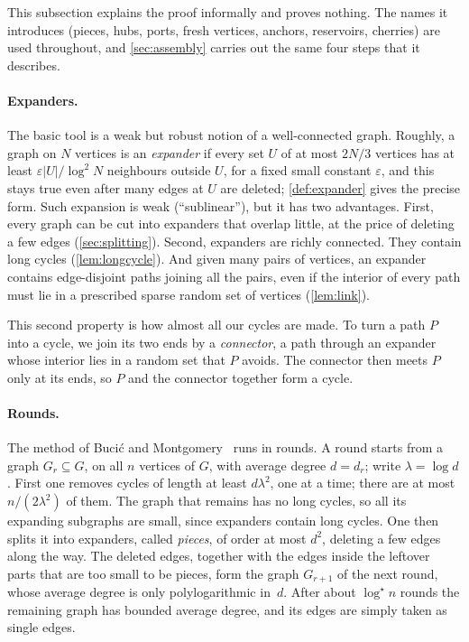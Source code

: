 \documentclass[11pt]{article}
\theoremstyle{definition}
\theoremstyle{remark}
\numberwithin{equation}{section}
\numberwithin{figure}{section}
\numberwithin{table}{section}
\newcommand{\eps}{\varepsilon}
\begin{document}
This subsection explains the proof informally and proves nothing. The names it
introduces (pieces, hubs, ports, fresh vertices, anchors, reservoirs, cherries)
are used throughout, and \cref{sec:assembly} carries out the same four steps
that it describes.

\paragraph{Expanders.} The basic tool is a weak but robust notion of a
well-connected graph. Roughly, a graph on $N$ vertices is an \emph{expander}
if every set $U$ of at most $2N/3$ vertices has at least $\eps|U|/\log^2N$
neighbours outside $U$, for a fixed small constant $\eps$, and this stays true even after many edges at $U$ are
deleted; \cref{def:expander} gives the precise form. Such expansion is weak
(``sublinear''), but it has two advantages. First, every graph can be cut into
expanders that overlap little, at the price of deleting a few edges
(\cref{sec:splitting}). Second, expanders are richly connected. They contain
long cycles (\cref{lem:longcycle}). And given many pairs of vertices, an
expander contains edge-disjoint paths joining all the pairs, even if the
interior of every path must lie in a prescribed sparse random set of vertices
(\cref{lem:link}).

This second property is how almost all our cycles are made. To turn a path $P$ into a
cycle, we join its two ends by a \emph{connector}, a path through an expander
whose interior lies in a random set that $P$ avoids. The connector then meets
$P$ only at its ends, so $P$ and the connector together form a cycle.

\paragraph{Rounds.} The method of Buci\'c and Montgomery~\cite{BM} runs in
rounds. A round starts from a graph $G_r\subseteq G$, on all $n$ vertices of
$G$, with average degree $d=d_r$; write $\lambda=\log d$. First one removes
cycles of length at least $d\lambda^2$, one at a time; there are at most
$n/(2\lambda^2)$ of them. The graph that remains has no long cycles, so all its
expanding subgraphs are small, since expanders contain long cycles. One then
splits it into expanders, called \emph{pieces}, of order at most $d^2$,
deleting a few edges along the way. The deleted edges, together with the edges
inside the leftover parts that are too small to be pieces, form the graph
$G_{r+1}$ of the next round, whose average degree is only polylogarithmic in~$d$. After about
$\log^\star n$ rounds the remaining graph has bounded average degree, and its
edges are simply taken as single edges.
\end{document}
